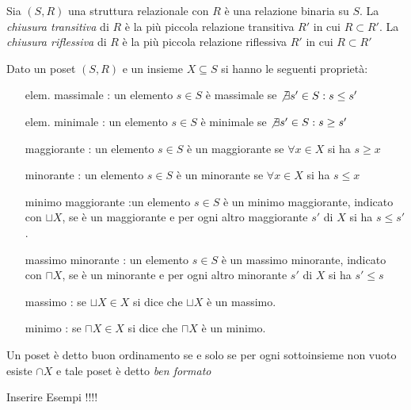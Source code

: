 Sia $(S,R)$ una struttura relazionale con $R$ è una relazione binaria su $S$.
La \emph{chiusura transitiva} di $R$ è la più piccola relazione transitiva $R'$ in cui $R \subset R'$.
La \emph{chiusura riflessiva} di $R$ è la più piccola relazione riflessiva $R'$ in cui $R \subset R'$

\begin{prop}
Dato un poset $(S,R)$ e un insieme $X \subseteq S$ si hanno le seguenti proprietà:
\end{prop}
\begin{enumerate}
    \item[elem. massimale]: un elemento $s \in S$ è massimale se $\not \exists s' \in S : s \leq s'$
    \item[elem. minimale]: un elemento $s \in S$ è minimale se $\not \exists s' \in S : s \geq s'$
    \item[maggiorante]: un elemento $s \in S$ è un maggiorante se $\forall x \in X$ si ha $s \geq x$
    \item[minorante]: un elemento $s \in S$ è un minorante se $\forall x \in X$ si ha $s \leq x$
    \item[minimo maggiorante]:un elemento $s \in S$ è un minimo maggiorante, indicato con $\sqcup X$,
          se è un maggiorante e per ogni altro maggiorante $s'$ di $X$ si ha $s \leq s'$.
    \item[massimo minorante]: un elemento $s \in S$ è un massimo minorante, indicato con $\sqcap X$,
          se è un minorante e per ogni altro minorante $s'$ di $X$ si ha $s' \leq s$
    \item[massimo]: se $\sqcup X \in X$ si dice che $\sqcup X$ è un massimo.
    \item[minimo]: se $\sqcap X \in X$ si dice che $\sqcap X$ è un minimo.
\end{enumerate}

\begin{defi}
    Un poset è detto buon ordinamento se e solo se per ogni sottoinsieme non vuoto esiste
    $\cap X$ e tale poset è detto \emph{ben formato}
\end{defi}

Inserire Esempi !!!!
